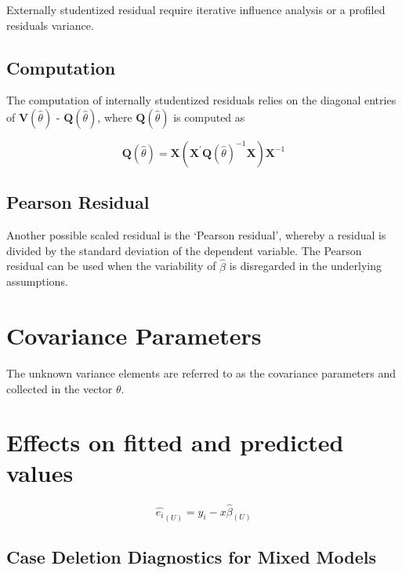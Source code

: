 \documentclass[a4paper,12pt]{article}
\begin{document}
Externally  studentized residual require iterative influence analysis or a profiled residuals variance.


\subsection{Computation}%

The computation of internally studentized residuals relies on the diagonal entries of $\boldsymbol{V} (\hat{\theta})$ - $\boldsymbol{Q} (\hat{\theta})$, where $\boldsymbol{Q} (\hat{\theta})$ is computed as

\[ \boldsymbol{Q} (\hat{\theta}) = \boldsymbol{X} ( \boldsymbol{X}^{\prime}\boldsymbol{Q} (\hat{\theta})^{-1}\boldsymbol{X})\boldsymbol{X}^{-1} \]

\subsection{Pearson Residual}%

Another possible scaled residual is the  `Pearson residual', whereby a residual is divided by the standard deviation of the dependent variable. The Pearson residual can be used when the variability of $\hat{\beta}$ is disregarded in the underlying assumptions.

\newpage
\section{Covariance Parameters} %
The unknown variance elements are referred to as the covariance parameters and collected in the vector $\theta$.
\newpage

\section{Effects on fitted and predicted values}
\begin{equation}
\hat{e_{i}}_{(U)} = y_{i} - x\hat{\beta}_{(U)}
\end{equation}

\subsection{Case Deletion Diagnostics for Mixed Models}
\end{document}
